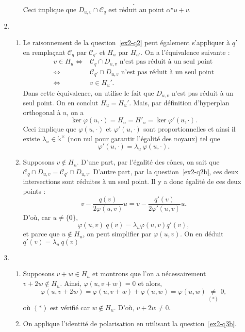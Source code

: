 \documentclass{../../td}
\begin{document}
\begin{enumerate}
\begin{enumerate}
\[          .\]
          Ceci implique que $D_{u,v} \cap \mathcal{C}_q$ est réduit au point $\alpha^\star u + v$.
      \end{enumerate}
    \item 
      \begin{enumerate}
        \item Le raisonnement de la question~\ref{ex2-q2} peut également s'appliquer à $q'$ en remplaçant $\mathcal{C}_q$ par $\mathcal{C}_{q'}$ et $H_u$ par $H_{u'}$.
          On a l'équivalence suivante :
          \begin{align*}
            v \in H_u \iff& \mathcal{C}_q \cap D_{u,v} \text{ n'est pas réduit à un seul point}\\
            \iff& \mathcal{C}_{q'} \cap D_{u,v} \text{ n'est pas réduit à un seul point}\\
            \iff& v \in H_u'
          .\end{align*}
          Dans cette équivalence, on utilise le fait que $D_{u,v}$ n'est pas réduit à un seul point.
          On en conclut $H_u = H_u'$.
          Mais, par définition d'hyperplan orthogonal à $u$, on a \[
          \ker \varphi(u, \cdot) = H_u = H'_u = \ker \varphi'(u, \cdot)
          .\]
          Ceci implique que $\varphi(u, \cdot)$ et $\varphi'(u, \cdot)$ sont proportionnelles et ainsi il existe $\lambda_u \in \mathds{k}^\times$ (non nul pour garantir l'égalité des noyaux) tel que \[
          \varphi'(u, \cdot) = \lambda_u \: \varphi(u, \cdot)
          .\]
        \item \label{ex2-q3b} Supposons $v\not\in H_u$. D'une part, par l'égalité des cônes, on sait que $\mathcal{C}_q \cap D_{u,v} = \mathcal{C}_{q'} \cap D_{u,v}$.
          D'autre part, par la question~\ref{ex2-q2b}, ces deux intersections sont réduites à un seul point.
          Il y a donc égalité de ces deux points : \[
          v - \frac{q(v)}{2 \varphi(u,v)} u = v - \frac{q'(v)}{2 \varphi'(u,v)} u 
          .\]
          D'où, car $u \neq \{0\}$, \[
            \varphi(u,v)\:q(v) = \lambda_u \varphi(u,v) q'(v)
          ,\] et parce que $u \not\in H_u$, on peut simplifier par $\varphi(u,v)$.
          On en déduit $q'(v) = \lambda_u\: q(v)$
      \end{enumerate}
    \item
      \begin{enumerate}
        \item \label{ex2-q4a} Supposons $v + w \in H_u$ et montrons que l'on a nécessairement $v + 2 w \not\in H_u$.
          Ainsi, $\varphi(u, v + w) = 0$ et alors, \[
          \varphi(u, v + 2 w) = \varphi(u, v + w) + \varphi(u,w) = \varphi(u,w) \underset {(*)} \neq 0
          ,\]
          où $(*)$ est vérifié car  $w \not\in H_u$.
          D'où, $v + 2 w \neq 0$.
        \item On applique l'identité de polarisation en utilisant la question~\ref{ex2-q3b}.


\end{enumerate}
\end{enumerate}
\end{document}
